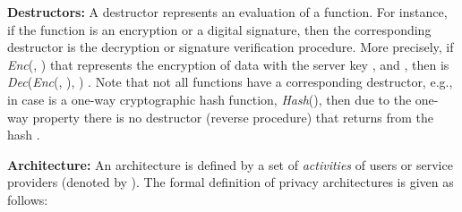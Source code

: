 \documentclass[a4paper]{article}
\begin{document}
\textbf{Destructors:} A destructor represents an evaluation of a function. For instance, if the function  is an encryption or a digital signature, then the corresponding destructor  is the decryption or signature verification procedure. More precisely, if   \textit{Enc}(, ) that represents the encryption of data  with the server key , and   , then    is \textit{Dec}(\textit{Enc}(, ), )  .  Note that not all functions have a corresponding destructor, e.g., in case  is a one-way cryptographic hash function,   \textit{Hash}(), then due to the one-way property there is no destructor (reverse procedure) that returns 
 from the hash .           




\textbf{Architecture:} An architecture  is defined by a set of \textit{activities} of users or service providers  
(denoted by ). The formal definition of privacy architectures is given as follows: 
\end{document}
